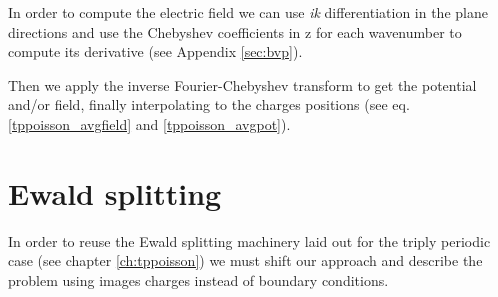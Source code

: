 \documentclass[ twoside,openright,titlepage,numbers=noenddot,%
headinclude,footinclude,cleardoublepage=empty,abstract=on,
BCOR=5mm,paper=a4,fontsize=11pt, dvipsnames
]{scrreprt}
\begin{document}
In order to compute the electric field we can use \emph{ik} differentiation in the plane directions and use the Chebyshev coefficients in z for each wavenumber to compute its derivative (see Appendix \ref{sec:bvp}).

Then we apply the inverse Fourier-Chebyshev transform to get the potential and/or field, finally interpolating to the charges positions (see eq. \eqref{tppoisson_avgfield} and \eqref{tppoisson_avgpot}).


\section{Ewald splitting}\label{sec:dpewald}
In order to reuse the Ewald splitting machinery laid out for the triply periodic case (see chapter \ref{ch:tppoisson}) we must shift our approach and describe the problem using images charges instead of boundary conditions.
\end{document}
